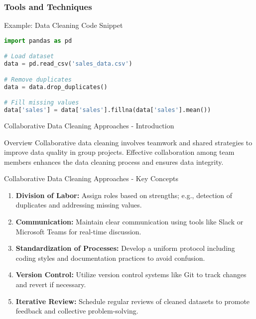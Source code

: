 \documentclass[aspectratio=169]{beamer}
\begin{document}
\begin{frame}[fragile]
    \frametitle{Tools and Techniques}
    \begin{block}{Example: Data Cleaning Code Snippet}
        \begin{lstlisting}[language=Python]
import pandas as pd

# Load dataset
data = pd.read_csv('sales_data.csv')

# Remove duplicates
data = data.drop_duplicates()

# Fill missing values
data['sales'] = data['sales'].fillna(data['sales'].mean())
        \end{lstlisting}
    \end{block}
\end{frame}

\begin{frame}[fragile]{Collaborative Data Cleaning Approaches - Introduction}
  \begin{block}{Overview}
    Collaborative data cleaning involves teamwork and shared strategies to improve data quality in group projects. 
    Effective collaboration among team members enhances the data cleaning process and ensures data integrity.
  \end{block}
\end{frame}

\begin{frame}[fragile]{Collaborative Data Cleaning Approaches - Key Concepts}
  \begin{enumerate}
    \item \textbf{Division of Labor:} Assign roles based on strengths; e.g., detection of duplicates and addressing missing values.
    
    \item \textbf{Communication:} Maintain clear communication using tools like Slack or Microsoft Teams for real-time discussion.
    
    \item \textbf{Standardization of Processes:} Develop a uniform protocol including coding styles and documentation practices to avoid confusion.
    
    \item \textbf{Version Control:} Utilize version control systems like Git to track changes and revert if necessary.
    
    \item \textbf{Iterative Review:} Schedule regular reviews of cleaned datasets to promote feedback and collective problem-solving.
  \end{enumerate}
\end{frame}
\end{document}
